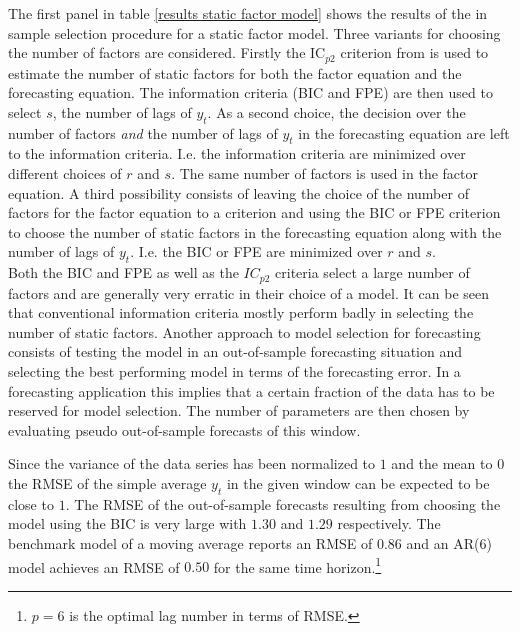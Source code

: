 \documentclass[12pt]{article}
\begin{document}
The first panel in table \ref{results static factor model} shows the results of the in sample selection procedure for a static factor model. Three variants for choosing the number of factors are considered. Firstly the IC$_{p2}$ criterion from \citet{bai2002determining} is used to estimate the number of static factors for both the factor equation and the forecasting equation. The information criteria (BIC and FPE) are then used to select $s$, the number of lags of $y_t$.
As a second choice, the decision over the number of factors \textit{and} the number of lags of $y_t$ in the forecasting equation are left to the information criteria. I.e. the information criteria are minimized over different choices of $r$ and $s$. The same number of factors is used in the factor equation.
A third possibility consists of leaving the choice of the number of factors for the factor equation to a \citet{bai2002determining} criterion and using the BIC or FPE criterion to choose the number of static factors in the forecasting equation along with the number of lags of $y_t$. I.e. the BIC or FPE are minimized over $r$ and $s$. \\

Both the BIC and FPE as well as the $IC_{p2}$ criteria select a large number of factors and are generally very erratic in their choice of a model. It can be seen that conventional information criteria mostly perform badly in selecting the number of static factors. Another approach to model selection for forecasting consists of testing the model in an out-of-sample forecasting situation and selecting the best performing model in terms of the forecasting error. In a forecasting application this implies that a certain fraction of the data has to be reserved for model selection. The number of parameters are then chosen by evaluating pseudo out-of-sample forecasts of this window.

Since the variance of the data series has been normalized to $1$ and the mean to $0$ the RMSE of the simple average $y_t$ in the given window can be expected to be close to $1$. The RMSE of the out-of-sample forecasts resulting from choosing the model using the BIC is very large with $1.30$ and $1.29$ respectively. The benchmark model of a moving average reports an RMSE of $0.86$ and an AR(6) model achieves an RMSE of $0.50$ for the same time horizon.\footnote{$p=6$ is the optimal lag number in terms of RMSE.}
\end{document}
